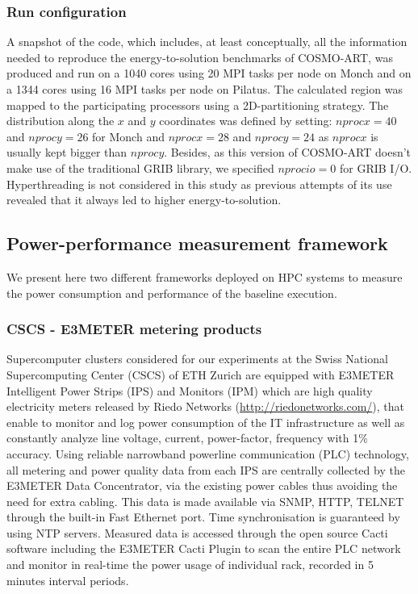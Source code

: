 \subsubsection{Run configuration}
A snapshot of the code, which includes, at least conceptually, all the
information needed  to reproduce the  energy-to-solution benchmarks of
COSMO-ART, was produced and run on a 1040 cores using 20 MPI tasks per
node on  Monch and  on a  1344 cores using  16 MPI  tasks per  node on
Pilatus.   The  calculated  region  was mapped  to  the  participating
processors using  a 2D-partitioning strategy.   The distribution along
the $x$  and $y$ coordinates  was defined by setting:  $nprocx=40$ and
$nprocy=26$ for  Monch and $nprocx=28$ and $nprocy=24$  as $nprocx$ is
usually  kept  bigger than  $nprocy$.   Besides,  as  this version  of
COSMO-ART  doesn't  make  use  of  the traditional  GRIB  library,  we
specified $nprocio=0$ for GRIB  I/O.  Hyperthreading is not considered
in this study as previous attempts  of its use revealed that it always
led to higher energy-to-solution.\\

\subsection{Power-performance measurement framework}
\label{subsec:3.3}

We present  here two different  frameworks deployed on HPC  systems to
measure  the  power  consumption   and  performance  of  the  baseline
execution.

\subsubsection{CSCS - E3METER metering products}
Supercomputer  clusters considered  for our  experiments at  the Swiss
National Supercomputing Center (CSCS)  of ETH Zurich are equipped with
E3METER Intelligent  Power Strips (IPS)  and Monitors (IPM)  which are
high   quality   electricity  meters   released   by  Riedo   Networks
(\url{http://riedonetworks.com/}),  that  enable  to monitor  and  log
power  consumption of  the  IT infrastructure  as  well as  constantly
analyze  line  voltage,  current,  power-factor,  frequency  with  1\%
accuracy.   Using reliable  narrowband  powerline communication  (PLC)
technology,  all metering  and power  quality data  from each  IPS are
centrally collected by the E3METER Data Concentrator, via the existing
power cables thus  avoiding the need for extra  cabling.  This data is
made  available  via SNMP,  HTTP,  TELNET  through  the built-in  Fast
Ethernet  port.   Time  synchronisation  is guaranteed  by  using  NTP
servers.   Measured data  is accessed  through the  open  source Cacti
software including  the E3METER  Cacti Plugin to  scan the  entire PLC
network and monitor  in real-time the power usage  of individual rack,
recorded in 5 minutes interval periods.

